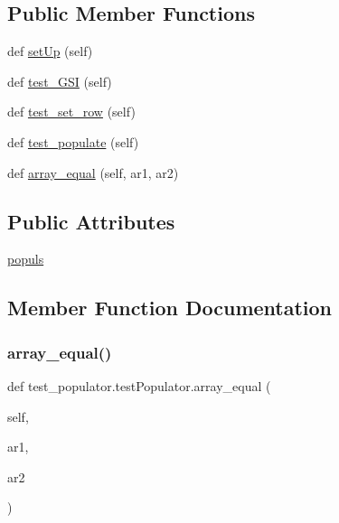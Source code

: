 \subsection*{Public Member Functions}
\begin{DoxyCompactItemize}
\item 
def \hyperlink{classtest__populator_1_1testPopulator_a70a42ae9715452ed7883ac657575e1f1}{set\+Up} (self)
\item 
def \hyperlink{classtest__populator_1_1testPopulator_a666a4e45fd82167a7c0be51fd6bc6052}{test\+\_\+\+G\+SI} (self)
\item 
def \hyperlink{classtest__populator_1_1testPopulator_a18de6d64a76cf381135a3c3e9ded5701}{test\+\_\+set\+\_\+row} (self)
\item 
def \hyperlink{classtest__populator_1_1testPopulator_a4a90f7a3031d37862799fa6c57940a44}{test\+\_\+populate} (self)
\item 
def \hyperlink{classtest__populator_1_1testPopulator_a7aa31940cc9ff05fe2fa04d0db9e68a7}{array\+\_\+equal} (self, ar1, ar2)
\end{DoxyCompactItemize}
\subsection*{Public Attributes}
\begin{DoxyCompactItemize}
\item 
\hyperlink{classtest__populator_1_1testPopulator_a54b000367bc251f9ae6ab601d04a781f}{populs}
\end{DoxyCompactItemize}


\subsection{Member Function Documentation}
\mbox{\label{classtest__populator_1_1testPopulator_a7aa31940cc9ff05fe2fa04d0db9e68a7}} 
\subsubsection{\texorpdfstring{array\+\_\+equal()}{array\_equal()}}
{\footnotesize\ttfamily def test\+\_\+populator.\+test\+Populator.\+array\+\_\+equal (\begin{DoxyParamCaption}\item[{}]{self,  }\item[{}]{ar1,  }\item[{}]{ar2 }\end{DoxyParamCaption})}

